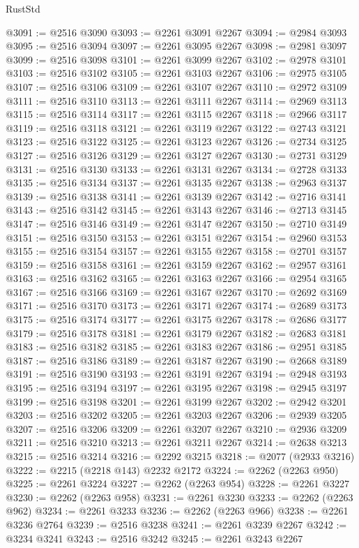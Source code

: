 \begin{lexlean}{RustStd}
\begin{coremodule}
@3091 := @2516 @3090
@3093 := @2261 @3091 @2267
@3094 := @2984 @3093
@3095 := @2516 @3094
@3097 := @2261 @3095 @2267
@3098 := @2981 @3097
@3099 := @2516 @3098
@3101 := @2261 @3099 @2267
@3102 := @2978 @3101
@3103 := @2516 @3102
@3105 := @2261 @3103 @2267
@3106 := @2975 @3105
@3107 := @2516 @3106
@3109 := @2261 @3107 @2267
@3110 := @2972 @3109
@3111 := @2516 @3110
@3113 := @2261 @3111 @2267
@3114 := @2969 @3113
@3115 := @2516 @3114
@3117 := @2261 @3115 @2267
@3118 := @2966 @3117
@3119 := @2516 @3118
@3121 := @2261 @3119 @2267
@3122 := @2743 @3121
@3123 := @2516 @3122
@3125 := @2261 @3123 @2267
@3126 := @2734 @3125
@3127 := @2516 @3126
@3129 := @2261 @3127 @2267
@3130 := @2731 @3129
@3131 := @2516 @3130
@3133 := @2261 @3131 @2267
@3134 := @2728 @3133
@3135 := @2516 @3134
@3137 := @2261 @3135 @2267
@3138 := @2963 @3137
@3139 := @2516 @3138
@3141 := @2261 @3139 @2267
@3142 := @2716 @3141
@3143 := @2516 @3142
@3145 := @2261 @3143 @2267
@3146 := @2713 @3145
@3147 := @2516 @3146
@3149 := @2261 @3147 @2267
@3150 := @2710 @3149
@3151 := @2516 @3150
@3153 := @2261 @3151 @2267
@3154 := @2960 @3153
@3155 := @2516 @3154
@3157 := @2261 @3155 @2267
@3158 := @2701 @3157
@3159 := @2516 @3158
@3161 := @2261 @3159 @2267
@3162 := @2957 @3161
@3163 := @2516 @3162
@3165 := @2261 @3163 @2267
@3166 := @2954 @3165
@3167 := @2516 @3166
@3169 := @2261 @3167 @2267
@3170 := @2692 @3169
@3171 := @2516 @3170
@3173 := @2261 @3171 @2267
@3174 := @2689 @3173
@3175 := @2516 @3174
@3177 := @2261 @3175 @2267
@3178 := @2686 @3177
@3179 := @2516 @3178
@3181 := @2261 @3179 @2267
@3182 := @2683 @3181
@3183 := @2516 @3182
@3185 := @2261 @3183 @2267
@3186 := @2951 @3185
@3187 := @2516 @3186
@3189 := @2261 @3187 @2267
@3190 := @2668 @3189
@3191 := @2516 @3190
@3193 := @2261 @3191 @2267
@3194 := @2948 @3193
@3195 := @2516 @3194
@3197 := @2261 @3195 @2267
@3198 := @2945 @3197
@3199 := @2516 @3198
@3201 := @2261 @3199 @2267
@3202 := @2942 @3201
@3203 := @2516 @3202
@3205 := @2261 @3203 @2267
@3206 := @2939 @3205
@3207 := @2516 @3206
@3209 := @2261 @3207 @2267
@3210 := @2936 @3209
@3211 := @2516 @3210
@3213 := @2261 @3211 @2267
@3214 := @2638 @3213
@3215 := @2516 @3214
@3216 := @2292 @3215
@3218 := @2077 (@2933 @3216)
@3222 := @2215 (@2218 @143) @2232 @2172
@3224 := @2262 (@2263 @950)
@3225 := @2261 @3224
@3227 := @2262 (@2263 @954)
@3228 := @2261 @3227
@3230 := @2262 (@2263 @958)
@3231 := @2261 @3230
@3233 := @2262 (@2263 @962)
@3234 := @2261 @3233
@3236 := @2262 (@2263 @966)
@3238 := @2261 @3236 @2764
@3239 := @2516 @3238
@3241 := @2261 @3239 @2267
@3242 := @3234 @3241
@3243 := @2516 @3242
@3245 := @2261 @3243 @2267

\end{coremodule}
\end{lexlean}
